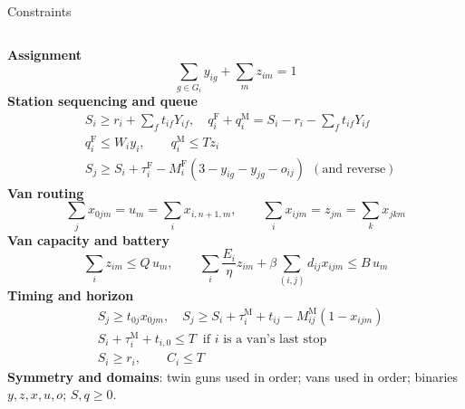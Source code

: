 \documentclass[aspectratio=169,11pt,t]{beamer}
\begin{document}
\begin{frame}{Constraints}
\scriptsize
\begin{columns}[T]
\textbf{Assignment}
\[ \textstyle\sum_{g\in G_i}y_{ig}+\sum_{m}z_{im}=1 \]
\textbf{Station sequencing and queue}
\[ \begin{aligned}
&S_i\ge r_i+\textstyle\sum_f t_{if}Y_{if},\quad q^{\mathrm F}_i+q^{\mathrm M}_i=S_i-r_i-\sum_f t_{if}Y_{if}\\
&q^{\mathrm F}_i\le W_iy_i,\qquad q^{\mathrm M}_i\le T z_i\\
&S_j\ge S_i+\tau^{\mathrm F}_i-M^{\mathrm F}_i(3-y_{ig}-y_{jg}-o_{ij})\ \ (\text{and reverse})
\end{aligned} \]
\textbf{Van routing}
\[ \textstyle\sum_j x_{0jm}=u_m=\sum_i x_{i,n+1,m},\qquad \sum_i x_{ijm}=z_{jm}=\sum_k x_{jkm} \]
\textbf{Van capacity and battery}
\[ \textstyle\sum_i z_{im}\le Q\,u_m,\qquad \sum_i\frac{E_i}{\eta}z_{im}+\beta\sum_{(i,j)}d_{ij}x_{ijm}\le B\,u_m \]
\textbf{Timing and horizon}
\[ \begin{aligned}
&S_j\ge t_{0j}x_{0jm},\quad S_j\ge S_i+\tau^{\mathrm M}_i+t_{ij}-M^{\mathrm M}_{ij}(1-x_{ijm})\\
&S_i+\tau^{\mathrm M}_i+t_{i,0}\le T\ \text{ if } i \text{ is a van's last stop}\\
&S_i\ge r_i,\qquad C_i\le T
\end{aligned} \]
\textbf{Symmetry and domains}: twin guns used in order; vans used in order; binaries $y,z,x,u,o$; $S,q\ge0$.
\end{columns}
\end{frame}
\end{document}
